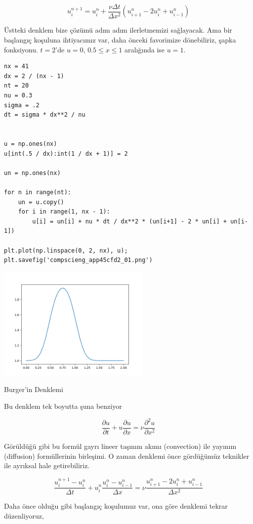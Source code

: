 \documentclass[12pt,fleqn]{article}\usepackage{../../common}
\begin{document}
$$
u_{i}^{n+1} =
u_{i}^{n}+\frac{\nu\Delta t}{\Delta x^2}(u_{i+1}^{n}-2u_{i}^{n}+u_{i-1}^{n})
$$

Üstteki denklem bize çözümü adım adım ilerletmemizi sağlayacak. Ama bir
başlangıç koşuluna ihtiyacımız var, daha önceki favorimize dönebiliriz, şapka
fonksiyonu. $t=2$'de $u=0$, $0.5\le x\le 1$ aralığında ise $u=1$. 

\begin{verbatim}
nx = 41
dx = 2 / (nx - 1)
nt = 20 
nu = 0.3 
sigma = .2 
dt = sigma * dx**2 / nu 


u = np.ones(nx)     
u[int(.5 / dx):int(1 / dx + 1)] = 2 

un = np.ones(nx)

for n in range(nt): 
    un = u.copy() 
    for i in range(1, nx - 1):
        u[i] = un[i] + nu * dt / dx**2 * (un[i+1] - 2 * un[i] + un[i-1])
        
plt.plot(np.linspace(0, 2, nx), u);
plt.savefig('compscieng_app45cfd2_01.png')
\end{verbatim}

\includegraphics[width=20em]{compscieng_app45cfd2_01.png}

Burger'in Denklemi

Bu denklem tek boyutta şuna benziyor

$$
\frac{\partial u}{\partial t} + u \frac{\partial u}{\partial x} =
\nu \frac{\partial ^2u}{\partial x^2}
$$

Görüldüğü gibi bu formül gayrı lineer taşınım akımı (convection) ile yayınım
(diffusion) formüllerinin birleşimi. O zaman denklemi önce gördüğümüz teknikler
ile ayrıksal hale getirebiliriz.

$$
\frac{u_i^{n+1}-u_i^n}{\Delta t} + u_i^n \frac{u_i^n - u_{i-1}^n}{\Delta x} =
\nu \frac{u_{i+1}^n - 2u_i^n + u_{i-1}^n}{\Delta x^2}
$$

Daha önce olduğu gibi başlangıç koşulumuz var, ona göre denklemi tekrar
düzenliyoruz,
\end{document}
